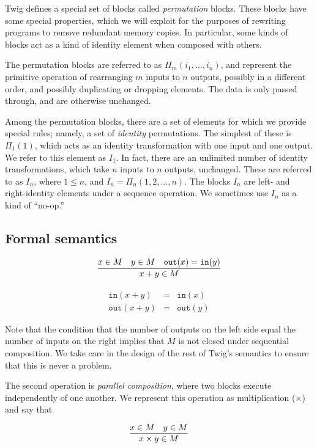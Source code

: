Twig defines a special set of blocks called \emph{permutation} blocks. These blocks have some special properties, which we will exploit for the purposes of rewriting programs to remove redundant memory copies. In particular, some kinds of blocks act as a kind of identity element when composed with others.

The permutation blocks are referred to as $\Pi_m(i_1,\ldots,i_n)$, and represent the primitive operation of rearranging $m$ inputs to $n$ outputs, possibly in a different order, and possibly duplicating or dropping elements. The data is only passed through, and are otherwise unchanged.

Among the permutation blocks, there are a set of elements for which we provide special rules; namely, a set of \emph{identity} permutations. The simplest of these is $\Pi_1(1)$, which acts as an identity transformation with one input and one output. We refer to this element as $I_1$. In fact, there are an unlimited number of identity transformations, which take $n$ inputs to $n$ outputs, unchanged. These are referred to as $I_n$, where $1 \leq n$, and $I_n = \Pi_n(1,2,\ldots,n)$. The blocks $I_n$ are left- and right-identity elements under a sequence operation. We sometimes use $I_n$ as a kind of ``no-op.''

\subsection{Formal semantics}

\[
\infer
{x+y \in M}
{x \in M \quad y \in M \quad \mathtt{out}(x) = \mathtt{in}(y)}
\]

\begin{eqnarray*}
\mathtt{in} (x+y) &=& \mathtt{in}(x)\\
\mathtt{out}(x+y) &=& \mathtt{out}(y)
\end{eqnarray*}
 
Note that the condition that the number of outputs on the left side equal the number of inputs on the right implies that $M$ is not closed under sequential composition. We take care in the design of the rest of Twig's semantics to ensure that this is never a problem.

The second operation is \emph{parallel composition}, where two blocks execute
independently of one another. We represent this operation as multiplication
($\times$) and say that

\[
\infer
{x \times y \in M}
{x \in M \quad y \in M}
\]

